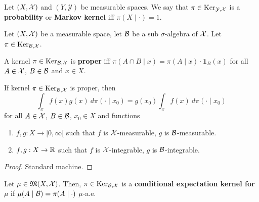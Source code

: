 \begin{definition}
    \label{def:markov-ker}
    \leanok

    Let $(X,\mathcal X)$ and $(Y,\mathcal{Y})$ be measurable spaces. We say that $\pi\in\text{Ker}_{\mathcal{Y},\mathcal X}$ is a \textbf{probability} or \textbf{Markov kernel} iff $\pi(X\mid \cdot)=1$.
\end{definition}

Let $(X, \mathcal X)$ be a measurable space, let $\mathcal B$ be a sub $\sigma$-algebra of $\mathcal X$. Let $\pi \in \text{Ker}_{\mathcal B, \mathcal X}$.

\begin{definition}
    \label{def:proper-kernel}
    \leanok

    A kernel $\pi\in\text{Ker}_{\mathcal B,\mathcal X}$ is \textbf{proper} iff $\pi(A\cap B\mid x)=\pi(A\mid x)\cdot\mathbf{1}_B(x)$ for all $A\in\mathcal X$, $B\in\mathcal B$ and $x\in X$.
\end{definition}

\begin{lemma}
    \label{lem:proper-kernel-integral}
    \leanok

    If kernel $\pi\in\text{Ker}_{\mathcal B,\mathcal X}$ is proper, then
    $$\int_x f(x) g(x)\ d\pi(\cdot\mid x_0) = g(x_0)\int_x f(x)\ d\pi(\cdot\mid x_0)$$
    for all $A \in \mathcal X$, $B \in \mathcal B$, $x_0 \in X$ and functions
    \begin{enumerate}
        \item $f, g : X \to [0, \infty[$ such that $f$ is $\mathcal X$-measurable, $g$ is $\mathcal B$-measurable.
        \item $f, g : X \to \mathbb R$ such that $f$ is $\mathcal X$-integrable, $g$ is $\mathcal B$-integrable.
    \end{enumerate}
\end{lemma}
\begin{proof}

    Standard machine.
\end{proof}

\begin{definition}
    \label{def:cond-exp-ker}
    \leanok

    Let $\mu\in\mathfrak{M}(X,\mathcal X)$. Then, $\pi\in\text{Ker}_{\mathcal B,\mathcal X}$ is a \textbf{conditional expectation kernel for $\mu$} if $\mu(A\mid \mathcal B)=\pi(A\mid\cdot)$ $\mu$-a.e.
\end{definition}

